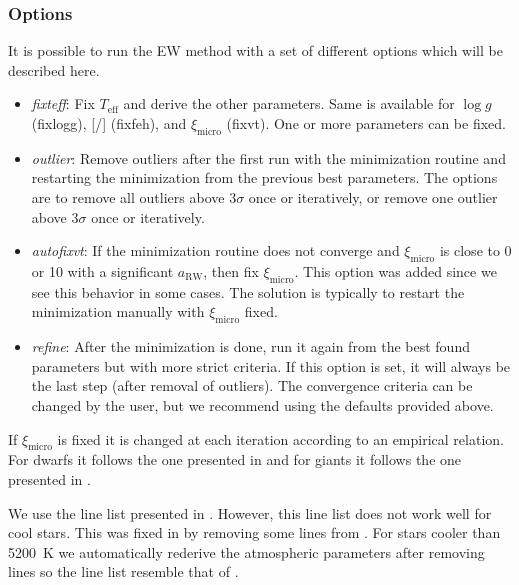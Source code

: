 \documentclass{aa}
\begin{document}
\subsubsection{Options}
\label{subs:EWoptions}
It is possible to run the EW method with a set of different options which
will be described here.

\begin{itemize}
    \item \emph{fixteff}: Fix $T_\mathrm{eff}$ and derive the other parameters.
          Same is available for $\log g$ (fixlogg), [/]
          (fixfeh), and $\xi_\mathrm{micro}$ (fixvt). One or more parameters
          can be fixed.
    \item \emph{outlier}: Remove outliers after the first run with the minimization
          routine and restarting the minimization from the previous best
          parameters. The options are to remove all outliers above $3\sigma$
          once or iteratively, or remove one outlier above $3\sigma$ once or
          iteratively.
    \item \emph{autofixvt}: If the minimization routine does not converge and
          $\xi_\mathrm{micro}$ is close to 0 or 10 with a significant
          $a_\mathrm{RW}$, then fix $\xi_\mathrm{micro}$. This option was added
          since we see this behavior in some cases. The solution is typically
          to restart the minimization manually with $\xi_\mathrm{micro}$
          fixed.
    \item \emph{refine}: After the minimization is done, run it again from the best
          found parameters but with more strict criteria. If this option is set,
          it will always be the last step (after removal of outliers). The
          convergence criteria can be changed by the user, but we recommend
          using the defaults provided above.
\end{itemize}
If $\xi_\mathrm{micro}$ is fixed it is changed at each iteration according to
an empirical relation. For dwarfs it follows the one presented in
\citet{Tsantaki2013} and for giants it follows the one presented in
\citet{Adibekyan2015}.

We use the line list presented in \citet{Sousa2008a}. However, this line list
does not work well for cool stars. This was fixed in \citet{Tsantaki2013}
by removing some lines from \citet{Sousa2008a}. For stars cooler than
\SI{5200}{K} we automatically rederive the atmospheric parameters after
removing lines so the line list resemble that of \citet{Tsantaki2013}.
\end{document}
